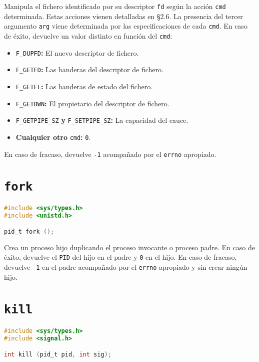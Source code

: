 Manipula el fichero identificado por su descriptor \texttt{fd} según la acción \texttt{cmd} determinada.
Estas acciones vienen detalladas en \S2.6.
La presencia del tercer argumento \texttt{arg} viene determinada por las especificaciones de cada \texttt{cmd}.
En caso de éxito, devuelve un valor distinto en función del \texttt{cmd}:

\begin{itemize}
	\item\texttt{F\_DUPFD}\textbf{:} El nuevo descriptor de fichero.
	\item\texttt{F\_GETFD}\textbf{:} Las banderas del descriptor de fichero.
	\item\texttt{F\_GETFL}\textbf{:} Las banderas de estado del fichero.
	\item\texttt{F\_GETOWN}\textbf{:} El propietario del descriptor de fichero.
	\item\texttt{F\_GETPIPE\_SZ} \textbf{y} \texttt{F\_SETPIPE\_SZ}\textbf{:} La capacidad del cauce.
	\item\textbf{Cualquier otro} \texttt{cmd}\textbf{:} \texttt{0}.
\end{itemize}

En caso de fracaso, devuelve \texttt{-1} acompañado por el \texttt{errno} apropiado.

\pagebreak

\section{\texttt{fork}}\label{fork}

\begin{lstlisting}[language=C]
#include <sys/types.h>
#include <unistd.h>

pid_t fork ();
\end{lstlisting}

Crea un proceso hijo duplicando el proceso invocante o proceso padre.
En caso de éxito, devuelve el \texttt{PID} del hijo en el padre y \texttt{0} en el hijo.
En caso de fracaso, devuelve \texttt{-1} en el padre acompañado por el \texttt{errno} apropiado y sin crear ningún hijo.

\section{\texttt{kill}}\label{kill}

\begin{lstlisting}[language=C]
#include <sys/types.h>
#include <signal.h>

int kill (pid_t pid, int sig);
\end{lstlisting}

